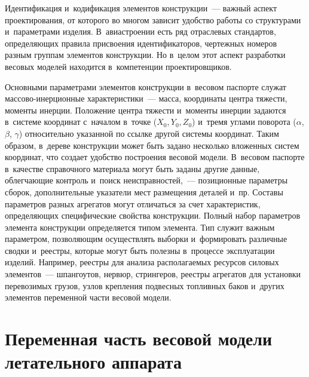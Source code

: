 \begin{multicols}{2}
  Идентификация и~кодификация элементов конструкции~--- важный аспект 
проектирования, от которого во многом зависит удобство работы со 
структурами и~параметрами изделия. В~авиа\-стро\-ении есть ряд отраслевых 
стандартов, определяющих правила присвоения идентификаторов, чертежных 
номеров разным группам элементов конструкции. Но в~целом этот аспект 
разработки весовых моделей находится в~компетенции проектировщиков.
  
  Основными параметрами элементов конструкции в~весовом паспорте служат 
мас\-со\-во-инер\-ци\-он\-ные характеристики~--- масса, координаты центра тяжести, 
моменты инерции. Положение центра тяжести и~моменты инерции задаются 
в~системе координат с~началом в~точке ($X_0, Y_0, Z_0$) и~тремя углами 
поворота ($\alpha$, $\beta$, $\gamma$) относительно указанной по ссылке другой 
системы координат. Таким образом, в~дереве конструкции может быть задано 
несколько вложенных систем координат, что создает удобство по\-стро\-ения 
весовой модели. В~весовом паспорте в~качестве справочного материала могут 
быть заданы другие данные, облегчающие контроль и~поиск  
неисправностей,~--- позиционные параметры сборок, дополнительные 
указатели мест размещения деталей и~пр. Со\-ста\-вы параметров разных 
агрегатов могут отличаться за счет характеристик, опре\-де\-ля\-ющих 
специфические свойства конструкции. Полный набор па\-ра\-мет\-ров элемента 
конструкции определяется типом элемента. Тип служит важным параметром, 
позволяющим осуществлять выборки и~формировать различные сводки 
и~реестры, которые могут быть полезны в~процессе эксплуатации изделий. 
Например, реестры для анализа рас\-по\-ла\-га\-емых ресурсов силовых элементов~--- 
шпангоутов, нервюр, стрингеров, реестры агрегатов для установки 
перевозимых грузов, узлов крепления подвесных топливных баков и~других 
элементов переменной части весовой модели. 

\vspace*{-6pt}

\section{Переменная часть весовой модели летательного аппарата}

\vspace*{-4pt}
 

\end{multicols}

